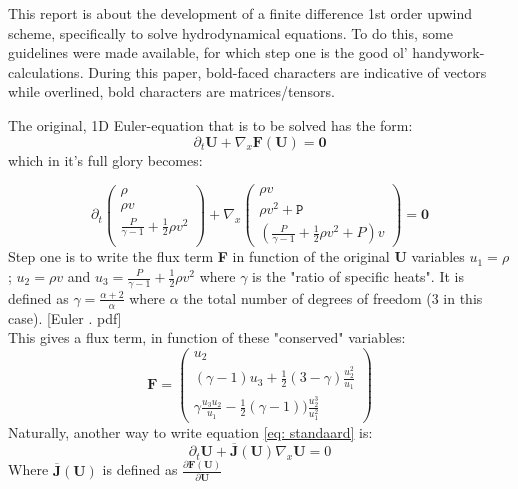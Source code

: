 \documentclass[a4paper]{article}
\begin{document}
This report is about the development of a finite difference 1st order upwind scheme, specifically to solve hydrodynamical equations. To do this, some guidelines were made available, for which step one is the good ol' handywork-calculations. During this paper, bold-faced characters are indicative of vectors while overlined, bold characters are matrices/tensors.

The original, 1D Euler-equation that is to be solved has the form:
\begin{equation}\label{eq: standaard}
\partial_t \mathtt{\textbf{U}} + \nabla_x \mathbf{F(U)} = \mathbf{0}
\end{equation}
which in it's full glory becomes:

\begin{equation}
\partial_t \left(
\begin{array}{c}
\rho\\
\rho v\\
\frac{P}{\gamma - 1} + \frac{1}{2}\rho v^2\\
\end{array}
\right) + \nabla_x 
\left(\begin{array}{c}
\rho v \\
\rho v^2 + \mathtt{P}\\
(\frac{P}{\gamma - 1} + \frac{1}{2}\rho v^2 + P)v
\end{array}\right) = \mathbf{0}
\end{equation}
Step one is to write the flux term  \textbf{F} in function of the original \textbf{U} variables $u_1 = \rho$; $u_2 = \rho v$ and $u_3 = \frac{P}{\gamma - 1} + \frac{1}{2}\rho v^2$  where $\gamma$ is the "ratio of specific heats". It is defined as $\gamma = \frac{\alpha +2}{\alpha}$ where $\alpha$ the total number of degrees of freedom (3 in this case). [Euler . pdf]\\
This gives a flux term, in function of these "conserved" variables: 
\begin{equation}
	\mathbf{F} = \left(\begin{array}{c}
		u_2\\
		(\gamma - 1)u_3 + \frac{1}{2}(3-\gamma)\frac{u_2^2}{u_1}\\
		\gamma \frac{u_3 u_2}{u_1} - \frac{1}{2}(\gamma-1))\frac{u_2^3}{u_1^2}
		
	\end{array}\right)
\end{equation}
Naturally, another way to write equation \ref{eq: standaard} is:
\begin{equation}\label{eq: jacobian}
	\partial_t \mathbf{U} + \overline{\textbf{J}}\mathbf{(U)} \nabla_x \mathbf{U} = 0
\end{equation}
Where $\overline{\textbf{J}}\mathbf{(U)}$ is defined as $\frac{\partial \mathbf{F(U)}}{\partial \mathbf{U}}$
\end{document}
